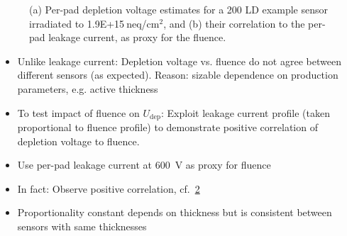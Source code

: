 \begin{figure}
\begin{subfigure}[b]{0.49\textwidth}
		\subcaption{
			}
			\label{plot:Vdep_vs_current_5414}
	\end{subfigure}
	\caption{
		(a) Per-pad depletion voltage estimates for a \SI{200}{\micron} LD example sensor irradiated to 1.9E+15$~$neq/cm$^{2}$, and 
		(b) their correlation to the per-pad leakage current, as proxy for the fluence.
	}
\end{figure}

\begin{itemize}
	\item Unlike leakage current: Depletion voltage vs. fluence do not agree between different sensors (as expected). Reason: sizable dependence on production parameters, e.g. active thickness
	\item To test impact of fluence on $U_\text{dep}$: Exploit leakage current profile (taken proportional to fluence profile) to demonstrate positive correlation of depletion voltage to fluence.
	\item Use per-pad leakage current at \SI{600}{\volt} as proxy for fluence
	\item In fact: Observe positive correlation, cf.~\ref{plot:Vdep_vs_current_5414}
	\item Proportionality constant depends on thickness but is consistent between sensors with same thicknesses
\end{itemize}